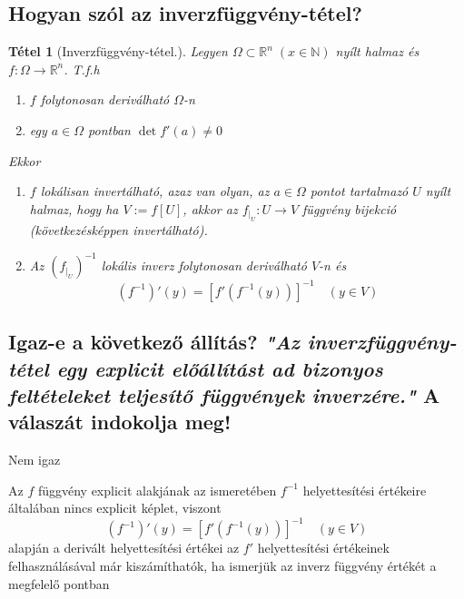 \documentclass[12pt,a4paper]{article}
\newcommand{\R}{\mathbb{R}}
\newcommand{\N}{\mathbb{N}}
\newcommand{\bb}[1]{\left( #1 \right)}
\newtheorem{tet}{Tétel}[section]
\begin{document}
\subsection{Hogyan szól az inverzfüggvény-tétel?}
\begin{tet}[Inverzfüggvény-tétel.]
Legyen $\Omega \subset \R^n \; (x\in\N)$  nyílt halmaz és $f: \Omega \rightarrow \R^n$. T.f.h
\begin{enumerate}
\item[(a)] $f$ folytonosan deriválható $\Omega$-n
\item[(b)] egy $a \in \Omega$ pontban $\det f'(a) \neq 0$
\end{enumerate}
Ekkor
\begin{enumerate}
\item $f$ lokálisan invertálható, azaz van olyan, az $a \in \Omega$ pontot tartalmazó $U$ nyílt halmaz, hogy ha $V := f[U]$, akkor az $f_{\mid_U} : U \rightarrow V$ függvény bijekció (következésképpen invertálható).
\item Az $\bb{f_{\mid_U}}^{-1}$ 
lokális inverz folytonosan deriválható $V$-n és
\[
\bb{f^{-1}}'(y) = \left[ f'(f^{-1}(y)) \right]^{-1} \quad (y \in V)
\]
\end{enumerate}
\end{tet}
\subsection{Igaz-e a következő állítás? \textit{"Az inverzfüggvény-tétel egy explicit előállítást ad bizonyos feltételeket teljesítő függvények inverzére."} A válaszát indokolja meg!}
Nem igaz

Az $f$ függvény explicit alakjának az ismeretében $f^{-1}$ helyettesítési értékeire általában nincs explicit képlet, viszont
\[
\bb{f^{-1}}'(y) = \left[ f'(f^{-1}(y)) \right]^{-1} \quad (y \in V)
\]
alapján a derivált helyettesítési értékei az $f'$ helyettesítési értékeinek felhasználásával már kiszámíthatók, ha ismerjük az inverz függvény értékét a megfelelő pontban
\end{document}

